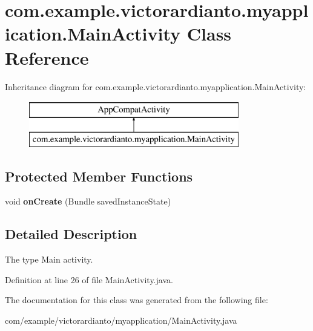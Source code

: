 \hypertarget{classcom_1_1example_1_1victorardianto_1_1myapplication_1_1_main_activity}{}\section{com.\+example.\+victorardianto.\+myapplication.\+Main\+Activity Class Reference}
\label{classcom_1_1example_1_1victorardianto_1_1myapplication_1_1_main_activity}
Inheritance diagram for com.\+example.\+victorardianto.\+myapplication.\+Main\+Activity\+:\begin{figure}[H]
\begin{center}
\leavevmode
\includegraphics[height=2.000000cm]{classcom_1_1example_1_1victorardianto_1_1myapplication_1_1_main_activity}
\end{center}
\end{figure}
\subsection*{Protected Member Functions}
\begin{DoxyCompactItemize}
\item 
\mbox{\label{classcom_1_1example_1_1victorardianto_1_1myapplication_1_1_main_activity_a23f04dd111a1fdb9b5675a9e0eccba70}} 
void {\bfseries on\+Create} (Bundle saved\+Instance\+State)
\end{DoxyCompactItemize}


\subsection{Detailed Description}
The type Main activity. 

Definition at line 26 of file Main\+Activity.\+java.



The documentation for this class was generated from the following file\+:\begin{DoxyCompactItemize}
\item 
com/example/victorardianto/myapplication/Main\+Activity.\+java\end{DoxyCompactItemize}
